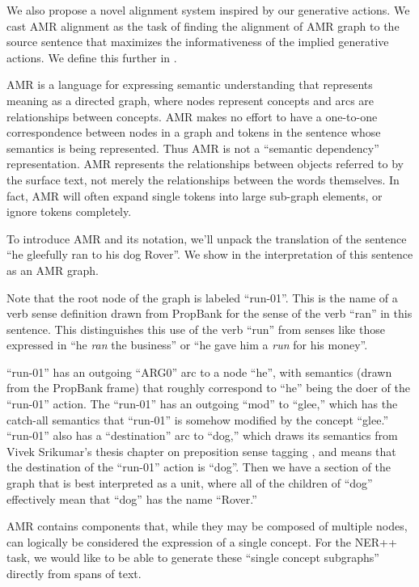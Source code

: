 \documentclass[11pt]{article}
\begin{document}
We also propose a novel alignment system inspired by our generative actions. We cast AMR alignment as the task of finding the alignment of AMR graph to the source sentence that maximizes the informativeness of the implied generative actions. We define this further in .


AMR is a language for expressing semantic understanding that represents meaning as a directed graph, where nodes represent concepts and arcs are relationships between concepts. AMR makes no effort to have a one-to-one correspondence between nodes in a graph and tokens in the sentence whose semantics is being represented. Thus AMR is not a ``semantic dependency'' representation. AMR represents the relationships between objects referred to by the surface text, not merely the relationships between the words themselves. In fact, AMR will often expand single tokens into large sub-graph elements, or ignore tokens completely.

To introduce AMR and its notation, we'll unpack the translation of the sentence ``he gleefully ran to his dog Rover''. We show in  the interpretation of this sentence as an AMR graph.

Note that the root node of the graph is labeled ``run-01''. This is the name of a verb sense definition drawn from PropBank \needcite for the sense of the verb ``ran'' in this sentence. This distinguishes this use of the verb ``run'' from senses like those expressed in ``he \textit{ran} the business'' or ``he gave him a \textit{run} for his money''.

``run-01'' has an outgoing ``ARG0'' arc to a node ``he'', with semantics (drawn from the PropBank frame) that roughly correspond to ``he'' being the doer of the ``run-01'' action. The ``run-01'' has an outgoing ``mod'' to ``glee,'' which has the catch-all semantics that ``run-01'' is somehow modified by the concept ``glee.'' ``run-01'' also has a ``destination'' arc to ``dog,'' which draws its semantics from Vivek Srikumar's thesis chapter on preposition sense tagging \needcite, and means that the destination of the ``run-01'' action is ``dog''. Then we have a section of the graph that is best interpreted as a unit, where all of the children of ``dog'' effectively mean that ``dog'' has the name ``Rover.''


AMR contains components that, while they may be composed of multiple nodes, can logically be considered the expression of a single concept. For the NER++ task, we would like to be able to generate these ``single concept subgraphs'' directly from spans of text.
\end{document}
